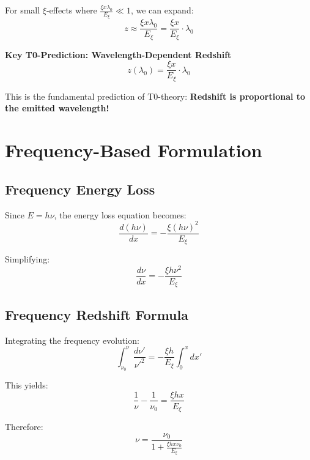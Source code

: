 \documentclass[12pt,a4paper]{article}
\newcommand{\Exi}{E_\xi}
\newcommand{\lambdazero}{\lambda_0}
\newcommand{\nuzero}{\nu_0}
\theoremstyle{definition}
\begin{document}
	For small $\xi$-effects where $\frac{\xi x \lambdazero}{\Exi} \ll 1$, we can expand:
	\begin{equation}
		z \approx \frac{\xi x \lambdazero}{\Exi} = \frac{\xi x}{\Exi} \cdot \lambdazero
	\end{equation}
	
	\begin{important}
		\textbf{Key T0-Prediction: Wavelength-Dependent Redshift}
		\begin{equation}
			\boxed{z(\lambdazero) = \frac{\xi x}{\Exi} \cdot \lambdazero}
		\end{equation}
		
		This is the fundamental prediction of T0-theory: \textbf{Redshift is proportional to the emitted wavelength!}
	\end{important}
	
	\section{Frequency-Based Formulation}
	
	\subsection{Frequency Energy Loss}
	
	Since $E = h\nu$, the energy loss equation becomes:
	\begin{equation}
		\frac{d(h\nu)}{dx} = -\frac{\xi (h\nu)^2}{\Exi}
	\end{equation}
	
	Simplifying:
	\begin{equation}
		\frac{d\nu}{dx} = -\frac{\xi h \nu^2}{\Exi}
	\end{equation}
	
	\subsection{Frequency Redshift Formula}
	
	Integrating the frequency evolution:
	\begin{equation}
		\int_{\nuzero}^{\nu} \frac{d\nu'}{\nu'^2} = -\frac{\xi h}{\Exi} \int_0^x dx'
	\end{equation}
	
	This yields:
	\begin{equation}
		\frac{1}{\nu} - \frac{1}{\nuzero} = \frac{\xi h x}{\Exi}
	\end{equation}
	
	Therefore:
	\begin{equation}
		\nu = \frac{\nuzero}{1 + \frac{\xi h x \nuzero}{\Exi}}
	\end{equation}
	
\end{document}
